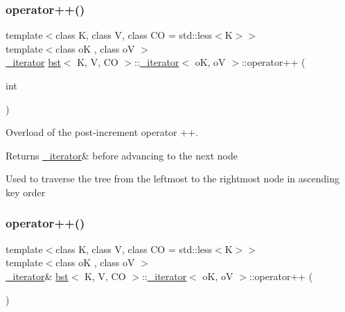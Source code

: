 \subsubsection{\texorpdfstring{operator++()}{operator++()}\hspace{0.1cm}{\footnotesize\ttfamily [2/4]}}
{\footnotesize\ttfamily template$<$class K, class V, class CO = std\+::less$<$\+K$>$$>$ \\
template$<$class oK , class oV $>$ \\
\hyperlink{classbst_1_1__iterator}{\+\_\+iterator} \hyperlink{classbst}{bst}$<$ K, V, CO $>$\+::\hyperlink{classbst_1_1__iterator}{\+\_\+iterator}$<$ oK, oV $>$\+::operator++ (\begin{DoxyParamCaption}\item[{int}]{ }\end{DoxyParamCaption})\hspace{0.3cm}{\ttfamily [inline]}}



Overload of the post-\/increment operator ++. 

\begin{DoxyReturn}{Returns}
\hyperlink{classbst_1_1__iterator}{\+\_\+iterator}\& before advancing to the next node
\end{DoxyReturn}
Used to traverse the tree from the leftmost to the rightmost node in ascending key order \mbox{\label{classbst_1_1__iterator_a37378dada06d3ceb1f802ab7288cd4ce}} 
\subsubsection{\texorpdfstring{operator++()}{operator++()}\hspace{0.1cm}{\footnotesize\ttfamily [3/4]}}
{\footnotesize\ttfamily template$<$class K, class V, class CO = std\+::less$<$\+K$>$$>$ \\
template$<$class oK , class oV $>$ \\
\hyperlink{classbst_1_1__iterator}{\+\_\+iterator}\& \hyperlink{classbst}{bst}$<$ K, V, CO $>$\+::\hyperlink{classbst_1_1__iterator}{\+\_\+iterator}$<$ oK, oV $>$\+::operator++ (\begin{DoxyParamCaption}{ }\end{DoxyParamCaption})\hspace{0.3cm}{\ttfamily [inline]}}



